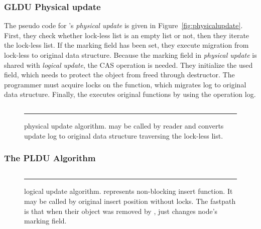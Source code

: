 \subsubsection{GLDU Physical update}

The pseudo code for 's \emph{physical update} is given in
Figure~\ref{fig:physicalupdate}.
First, they check whether lock-less list is an empty list or not, then they
iterate the lock-less list.
If the marking field has been set, they execute migration from
lock-less to original data structure.
Because the marking field in \emph{physical update} is shared with
 \emph{logical update}, the CAS operation is needed.
They initialize the used field, which needs to protect the object from freed
 through destructor.
The programmer must acquire locks on the  function,
which migrates log to original data structure.
Finally, the  executes original functions by using the
operation log.

\begin{figure}[tb!]

\inputminted[linenos,fontsize=\footnotesize, tabsize=2]{c}{src/ldu_physical.c}

\rule{\columnwidth}{0.5pt}
\vspace{-\baselineskip}
\caption{ physical update algorithm.  may be
 called by reader and converts update log to original data structure
 traversing the lock-less list.}
\label{fig:glduphysicalupdate}
\end{figure}



\subsubsection{The PLDU Algorithm}

\begin{figure}[tb!]

\inputminted[linenos,fontsize=\footnotesize, tabsize=2]{c}{src/pldu_logical.c}
\rule{\columnwidth}{0.5pt}
\vspace{-\baselineskip}
\caption{ logical update algorithm.  represents
 non-blocking insert function.
It may be called by original insert position without locks. The fastpath is
 that when their object was removed by ,
  just changes node's marking field.}
\label{fig:ppldulogicalupdate}
\end{figure}


